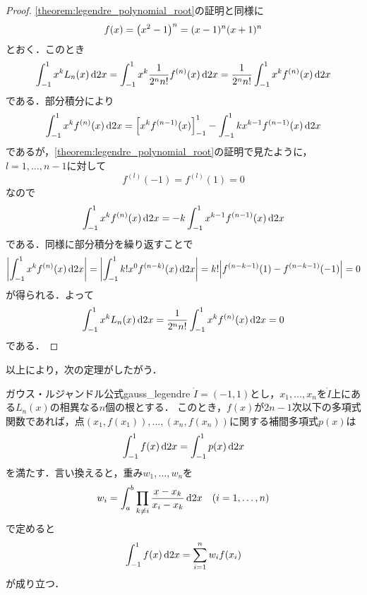 \documentclass[a4paper]{ltjsarticle}
\theoremstyle{definition}
\DeclarePairedDelimiter{\abs}{\lvert}{\rvert}
\DeclarePairedDelimiter{\pqty}{\lparen}{\rparen}
\DeclarePairedDelimiter{\bqty}{\lbrack}{\rbrack}
\newcommand{\dd}[1]{\dl2#1}
\begin{document}
\begin{proof}
  \cref{theorem:legendre_polynomial_root}の証明と同様に
  \[
    f(x) = \pqty*{x^2-1}^n = (x-1)^n (x+1)^n
  \]
  とおく．このとき
  \[
    \int_{-1}^1 x^k L_n(x) \dd{x}
    = \int_{-1}^1 x^k \frac{1}{2^n n!} f^{(n)}(x) \dd{x}
    = \frac{1}{2^n n!} \int_{-1}^1 x^k f^{(n)}(x) \dd{x}
  \]
  である．部分積分により
  \[
    \int_{-1}^1 x^k f^{(n)}(x) \dd{x}
    = \bqty*{x^k f^{(n-1)}(x)}_{-1}^1 - \int_{-1}^1 kx^{k-1} f^{(n-1)}(x) \dd{x}
  \]
  であるが，\cref{theorem:legendre_polynomial_root}の証明で見たように，$l=1,\dots,n-1$に対して
  \[
    f^{(l)}(-1) = f^{(l)}(1) = 0
  \]
  なので
  \[
    \int_{-1}^1 x^k f^{(n)}(x) \dd{x}
    = -k\int_{-1}^1 x^{k-1} f^{(n-1)}(x) \dd{x}
  \]
  である．同様に部分積分を繰り返すことで
  \[
    \abs*{\int_{-1}^1 x^k f^{(n)}(x) \dd{x}}
    = \abs*{\int_{-1}^1 k! x^0 f^{(n-k)}(x) \dd{x}}
    = k! \abs*{f^{(n-k-1)}(1) - f^{(n-k-1)}(-1)}
    = 0
  \]
  が得られる．よって
  \[
    \int_{-1}^1 x^k L_n(x) \dd{x}
    = \frac{1}{2^n n!} \int_{-1}^1 x^k f^{(n)}(x) \dd{x}
    = 0
  \]
  である．
\end{proof}

以上により，次の定理がしたがう．

\begin{theorem}{ガウス・ルジャンドル公式}{gauss_legendre}
  $\mathring{I} = (-1,1)$とし，$x_1,\dots,x_n$を$\mathring{I}$上にある$L_n(x)$の相異なる$n$個の根とする．
  このとき，$f(x)$が$2n-1$次以下の多項式関数であれば，点$(x_1,f(x_1)),\dots,(x_n,f(x_n))$に関する補間多項式$p(x)$は
  \[
    \int_{-1}^1 f(x) \dd{x} = \int_{-1}^1 p(x) \dd{x}
  \]
  を満たす．言い換えると，重み$w_1,\dots,w_n$を
  \[
    w_i = \int_a^b \prod_{k\neq i} \frac{x - x_k}{x_i - x_k} \dd{x}
    \quad (i = 1,\dots,n)
  \]
  で定めると
  \[
    \int_{-1}^1 f(x) \dd{x} = \sum_{i=1}^n w_i f(x_i)
  \]
  が成り立つ．
\end{theorem}
\end{document}
